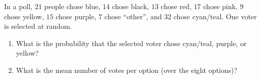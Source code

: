 In a poll, \(21\) people chose blue, \(14\) chose black, \(13\) chose red, \(17\) chose pink, \(9\) chose yellow, \(15\) chose purple, \(7\) chose ``other'', and \(32\) chose cyan/teal. One voter is selected at random.
\begin{enumerate}
\item[(a)] What is the probability that the selected voter chose cyan/teal, purple, or yellow?
\item[(b)] What is the mean number of votes per option (over the eight options)?
\end{enumerate}
